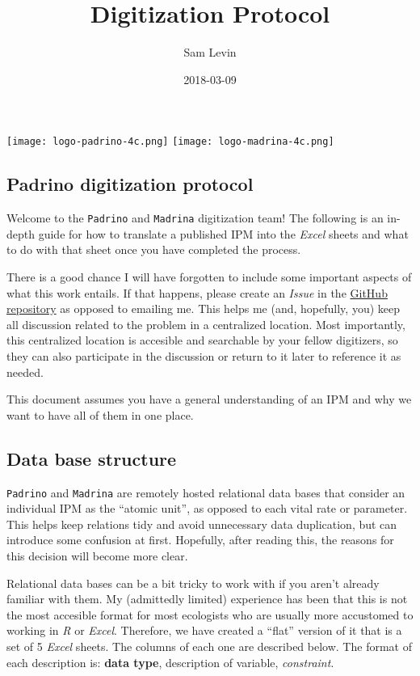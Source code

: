 \documentclass[]{article}
\title{Digitization Protocol}
\author{Sam Levin}
\date{2018-03-09}
\begin{document}
\maketitle

{
\setcounter{tocdepth}{5}
\tableofcontents
}
\newpage

\texttt{[image: logo-padrino-4c.png]}
\texttt{[image: logo-madrina-4c.png]}

\newpage

\subsection{Padrino digitization
protocol}\label{padrino-digitization-protocol}

Welcome to the \texttt{Padrino} and \texttt{Madrina} digitization team!
The following is an in-depth guide for how to translate a published IPM
into the \emph{Excel} sheets and what to do with that sheet once you
have completed the process.

There is a good chance I will have forgotten to include some important
aspects of what this work entails. If that happens, please create an
\emph{Issue} in the \href{https://github.com/levisc8/Padrino}{GitHub
repository} as opposed to emailing me. This helps me (and, hopefully,
you) keep all discussion related to the problem in a centralized
location. Most importantly, this centralized location is accesible and
searchable by your fellow digitizers, so they can also participate in
the discussion or return to it later to reference it as needed.

This document assumes you have a general understanding of an IPM and why
we want to have all of them in one place.

\subsection{Data base structure}\label{data-base-structure}

\texttt{Padrino} and \texttt{Madrina} are remotely hosted relational
data bases that consider an individual IPM as the ``atomic unit'', as
opposed to each vital rate or parameter. This helps keep relations tidy
and avoid unnecessary data duplication, but can introduce some confusion
at first. Hopefully, after reading this, the reasons for this decision
will become more clear.

Relational data bases can be a bit tricky to work with if you aren't
already familiar with them. My (admittedly limited) experience has been
that this is not the most accesible format for most ecologists who are
usually more accustomed to working in \emph{R} or \emph{Excel}.
Therefore, we have created a ``flat'' version of it that is a set of 5
\emph{Excel} sheets. The columns of each one are described below. The
format of each description is: \textbf{data type}, description of
variable, \emph{constraint}.
\end{document}
